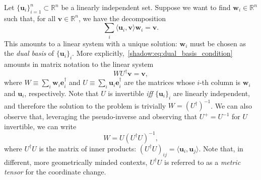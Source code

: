 \documentclass[12pt]{report}
\newcommand{\RR}{\mathbb{R}}
\newcommand{\bs}[1]{\boldsymbol{#1}}
\begin{document}
\begin{exercise}
	Let $\{\bs u_i\}_{i=1}^n\subset\RR^n$ be a linearly independent set. Suppose we want to find $\bs w_i\in\RR^n$ such that, for all $\bs v\in\RR^n$, we have the decomposition
	\begin{equation}\label{shadow:eq:dual_basis_condition}
		\sum_i \langle \bs u_i, \bs v\rangle \bs w_i = \bs v.
	\end{equation}
	This amounts to a linear system with a unique solution: $\bs w_i$ must be chosen as the \emph{dual basis} of $\{\bs u_i\}_i$.
	More explicitly,~\cref{shadow:eq:dual_basis_condition} amounts in matrix notation to the linear system
	\begin{equation}
		W U^\dagger \bs v = \bs v,
	\end{equation}
	where $W\equiv\sum_i \bs w_i \bs e_i^\dagger$ and $U\equiv \sum_i \bs u_i \bs e_i^\dagger$ are the matrices whose $i$-th column is $\bs w_i$ and $\bs u_i$, respectively.
	Note that $U$ is invertible \emph{iff} $\{\bs u_i\}_i$ are linearly independent, and therefore the solution to the problem is trivially $W=(U^\dagger)^{-1}$.
	We can also observe that, leveraging the pseudo-inverse and observing that $U^+=U^{-1}$ for $U$ invertible, we can write
	\begin{equation}
		W = U (U^\dagger U)^{-1},
	\end{equation}
	where $U^\dagger U$ is the matrix of inner products: $(U^\dagger U)_{ij}=\langle \bs u_i, \bs u_j\rangle$.
	Note that, in different, more geometrically minded contexts, $U^\dagger U$ is referred to as a \emph{metric tensor} for the coordinate change.
\end{exercise}
\end{document}
